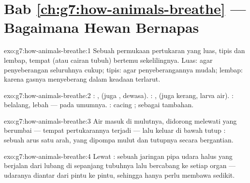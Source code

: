 \section*{Bab \ref{ch:g7:how-animals-breathe} --- Bagaimana Hewan Bernapas}

\begin{solution}{exo:g7:how-animals-breathe:1}
Sebuah permukaan pertukaran yang luas, tipis dan lembap, tempat 
(atau cairan tubuh) bertemu sekelilingnya. Luas: agar penyeberangan
seluruhnya cukup; tipis: agar penyeberangannya mudah; lembap: karena
gasnya menyeberang dalam keadaan terlarut.
\end{solution}

\begin{solution}{exo:g7:how-animals-breathe:2}
: ,  (juga ,  dewasa). : ,
 (juga kerang, larva air). : belalang, lebah --- 
pada umumnya. : cacing ;  sebagai tambahan.
\end{solution}

\begin{solution}{exo:g7:how-animals-breathe:3}
Air masuk di mulutnya, didorong melewati  yang berumbai ---
tempat pertukarannya terjadi --- lalu keluar di bawah tutup :
sebuah arus satu arah, yang dipompa mulut dan tutupnya secara
bergantian.
\end{solution}

\begin{solution}{exo:g7:how-animals-breathe:4}
Lewat : sebuah jaringan pipa udara halus yang berjalan dari
lubang di sepanjang tubuhnya lalu bercabang ke setiap organ ---
udaranya diantar dari pintu ke pintu, sehingga  hanya perlu
membawa sedikit.
\end{solution}

